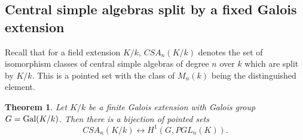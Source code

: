 \documentclass[11pt]{amsart}
\numberwithin{equation}{section}
\newtheorem{theorem}[equation]{Theorem}
\theoremstyle{remark}
\theoremstyle{remark}
\theoremstyle{remark}
\theoremstyle{definition}
\theoremstyle{definition}
\theoremstyle{definition}
\theoremstyle{definition}
\theoremstyle{definition}
\theoremstyle{definition}
\begin{document}
\subsection{Central simple algebras split by a fixed Galois extension} \label{csas split by cohom} 

Recall that for a field extension $K/k$,  $CSA_n(K/k)$ denotes the set of isomorphism classes of central simple algebras of degree $n$ over $k$ which are split by $K/k$. This is a pointed set with the class of $M_n(k)$ being the distinguished element. 

\begin{theorem} \label{cohom classifying central simple algebras}
Let $K/k$ be a finite Galois extension  with Galois group $G=\textup{Gal}(K/k)$. Then there is a bijection of pointed sets
\[CSA_n(K/k) \leftrightarrow H^1\left(G,PGL_n(K)\right).\]
\end{theorem}
\end{document}
